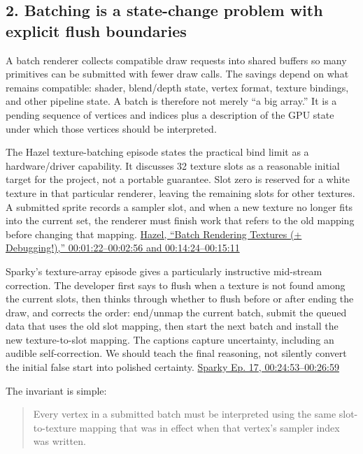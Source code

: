 \subsection{2. Batching is a state-change problem with explicit flush boundaries}\label{06-engine-ii-ch041-batching-is-a-state-change-problem-with-explicit-flush-boundaries}

A batch renderer collects compatible draw requests into shared buffers so many primitives can be submitted with fewer draw calls. The savings depend on what remains compatible: shader, blend/depth state, vertex format, texture bindings, and other pipeline state. A batch is therefore not merely ``a big array.'' It is a pending sequence of vertices and indices plus a description of the GPU state under which those vertices should be interpreted.

The Hazel texture-batching episode states the practical bind limit as a hardware/driver capability. It discusses 32 texture slots as a reasonable initial target for the project, not a portable guarantee. Slot zero is reserved for a white texture in that particular renderer, leaving the remaining slots for other textures. A submitted sprite records a sampler slot, and when a new texture no longer fits into the current set, the renderer must finish work that refers to the old mapping before changing that mapping. \href{https://www.youtube.com/watch?v=Fz1VySWaad8&t=1m22s}{Hazel, ``Batch Rendering Textures (+ Debugging!),'' 00:01:22--00:02:56 and 00:14:24--00:15:11}

Sparky's texture-array episode gives a particularly instructive mid-stream correction. The developer first says to flush when a texture is not found among the current slots, then thinks through whether to flush before or after ending the draw, and corrects the order: end/unmap the current batch, submit the queued data that uses the old slot mapping, then start the next batch and install the new texture-to-slot mapping. The captions capture uncertainty, including an audible self-correction. We should teach the final reasoning, not silently convert the initial false start into polished certainty. \href{https://www.youtube.com/watch?v=1x4hrdS97cI&t=24m53s}{Sparky Ep. 17, 00:24:53--00:26:59}

The invariant is simple:

\begin{quote}
Every vertex in a submitted batch must be interpreted using the same slot-to-texture mapping that was in effect when that vertex's sampler index was written.
\end{quote}

